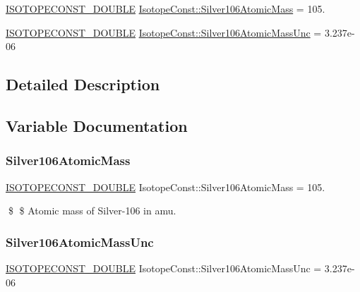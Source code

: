 \begin{DoxyCompactItemize}
\item 
\mbox{\hyperlink{group___isotope_const-_macros_ga8f45a7272ce02c0b4c65c44636ed719a}{I\+S\+O\+T\+O\+P\+E\+C\+O\+N\+S\+T\+\_\+\+D\+O\+U\+B\+LE}} \mbox{\hyperlink{group___isotope_const-_silver-_ag106_gad39dd16530ba289e70ee5f4b63d0cfe5}{Isotope\+Const\+::\+Silver106\+Atomic\+Mass}} = 105.
\item 
\mbox{\hyperlink{group___isotope_const-_macros_ga8f45a7272ce02c0b4c65c44636ed719a}{I\+S\+O\+T\+O\+P\+E\+C\+O\+N\+S\+T\+\_\+\+D\+O\+U\+B\+LE}} \mbox{\hyperlink{group___isotope_const-_silver-_ag106_ga07d2d6c2e32f6daf7d02210e543fc321}{Isotope\+Const\+::\+Silver106\+Atomic\+Mass\+Unc}} = 3.\+237e-\/06
\end{DoxyCompactItemize}


\subsection{Detailed Description}


\subsection{Variable Documentation}
\mbox{\label{group___isotope_const-_silver-_ag106_gad39dd16530ba289e70ee5f4b63d0cfe5}} 
\subsubsection{\texorpdfstring{Silver106\+Atomic\+Mass}{Silver106AtomicMass}}
{\footnotesize\ttfamily \mbox{\hyperlink{group___isotope_const-_macros_ga8f45a7272ce02c0b4c65c44636ed719a}{I\+S\+O\+T\+O\+P\+E\+C\+O\+N\+S\+T\+\_\+\+D\+O\+U\+B\+LE}} Isotope\+Const\+::\+Silver106\+Atomic\+Mass = 105.}

\$ \$ Atomic mass of Silver-\/106 in amu. \mbox{\label{group___isotope_const-_silver-_ag106_ga07d2d6c2e32f6daf7d02210e543fc321}} 
\subsubsection{\texorpdfstring{Silver106\+Atomic\+Mass\+Unc}{Silver106AtomicMassUnc}}
{\footnotesize\ttfamily \mbox{\hyperlink{group___isotope_const-_macros_ga8f45a7272ce02c0b4c65c44636ed719a}{I\+S\+O\+T\+O\+P\+E\+C\+O\+N\+S\+T\+\_\+\+D\+O\+U\+B\+LE}} Isotope\+Const\+::\+Silver106\+Atomic\+Mass\+Unc = 3.\+237e-\/06}

